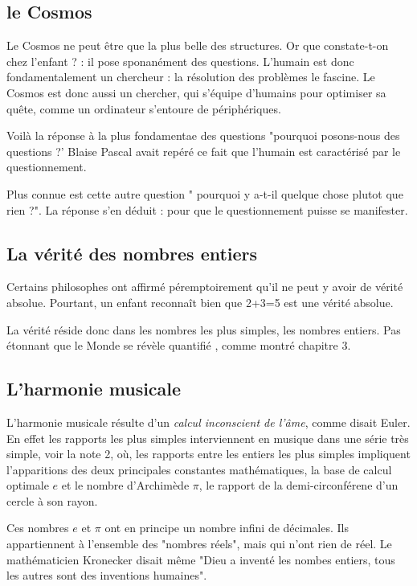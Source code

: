 \documentclass[a4paper,12pt]{article}
\begin{document}
\subsection {le Cosmos}

Le Cosmos ne peut être que la plus belle des structures. Or que constate-t-on chez l'enfant ? : il pose sponanément des questions. L'humain est donc fondamentalement un chercheur : la résolution des problèmes le fascine. Le Cosmos est donc aussi un chercher, qui s'équipe d'humains pour optimiser sa quête, comme un ordinateur s'entoure de périphériques.

Voilà la réponse à la plus fondamentae des questions "pourquoi posons-nous des questions ?' Blaise Pascal avait repéré ce fait que l'humain est caractérisé par le questionnement.

Plus connue est cette autre question " pourquoi y a-t-il quelque chose plutot que rien ?". La réponse s'en déduit : pour que le questionnement puisse se manifester.


\subsection{La vérité des nombres entiers}

Certains philosophes ont affirmé péremptoirement qu'il ne peut y avoir de vérité absolue. Pourtant, un enfant reconnaît bien que 2+3=5 est une vérité absolue.

La vérité réside donc dans les nombres les plus simples, les nombres entiers. Pas étonnant que le Monde se révèle quantifié , comme montré chapitre 3.

\subsection{L'harmonie musicale}

L'harmonie musicale résulte d'un \textit{calcul inconscient de l'âme}, comme disait Euler. En effet les rapports les plus simples interviennent en musique dans une série très simple, voir la note 2, où, les rapports entre les entiers les plus simples impliquent l'apparitions des deux principales constantes mathématiques, la base de calcul optimale $e$ et le nombre d'Archimède $\pi$, le rapport de la demi-circonférene d'un cercle à son rayon.

Ces nombres $e$ et $\pi$ ont en principe un nombre infini de décimales. Ils appartiennent à l'ensemble des "nombres réels", mais qui n'ont rien de réel. Le mathématicien Kronecker disait même "Dieu a inventé les nombes entiers, tous les autres sont des inventions humaines".
\end{document}
